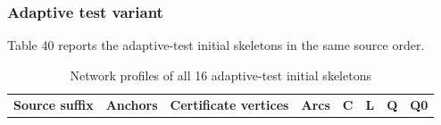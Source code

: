 \documentclass[pdflatex,sn-basic,Numbered]{sn-jnl}
\begin{document}
\subsubsection*{Adaptive test variant}\label{adaptive-test-variant}

Table 40 reports the adaptive-test initial skeletons in the same source order.

\begingroup
\small
\setlength{\tabcolsep}{3pt}
\renewcommand{\arraystretch}{1.13}

\begin{longtable}[]{@{}
  >{\raggedright\arraybackslash}p{}
  >{\raggedleft\arraybackslash}p{}
  >{\raggedleft\arraybackslash}p{}
  >{\raggedleft\arraybackslash}p{}
  >{\raggedleft\arraybackslash}p{}
  >{\raggedleft\arraybackslash}p{}
  >{\raggedleft\arraybackslash}p{}
  >{\raggedleft\arraybackslash}p{}@{}}
\caption{Network profiles of all 16 adaptive-test initial skeletons}\label{tab:40}\tabularnewline
\toprule\noalign{}
\begin{minipage}[b]{\linewidth}\raggedright
\textbf{Source suffix}
\end{minipage} & \begin{minipage}[b]{\linewidth}\raggedleft
\textbf{Anchors}
\end{minipage} & \begin{minipage}[b]{\linewidth}\raggedleft
\textbf{Certificate vertices}
\end{minipage} & \begin{minipage}[b]{\linewidth}\raggedleft
\textbf{Arcs}
\end{minipage} & \begin{minipage}[b]{\linewidth}\raggedleft
\textbf{C}
\end{minipage} & \begin{minipage}[b]{\linewidth}\raggedleft
\textbf{L}
\end{minipage} & \begin{minipage}[b]{\linewidth}\raggedleft
\textbf{Q}
\end{minipage} & \begin{minipage}[b]{\linewidth}\raggedleft
\textbf{Q0}
\end{minipage} \\

\end{longtable}
\end{document}
